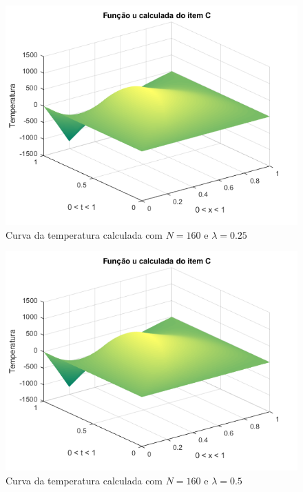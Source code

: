 \documentclass[12pt]{article}
\begin{document}
\begin{spacing}{1.5}
\begin{figure}
    \centering
    \includegraphics[width=0.8\linewidth]{Primeira_Tarefa/ItemC/n160_lambda0-25_calc.png}
    \caption{Curva da temperatura calculada com $N=160$ e $\lambda=0.25$}
    \label{fig:C_n160lambda0-25_exata}
\end{figure}
\begin{figure}
    \centering
    \includegraphics[width=0.8\linewidth]{Primeira_Tarefa/ItemC/n160_lambda0-5_calc.png}
    \caption{Curva da temperatura calculada com $N=160$ e $\lambda=0.5$}
    \label{fig:C_n160lambda0-5_calc}
\end{figure}



\end{spacing}
\end{document}
